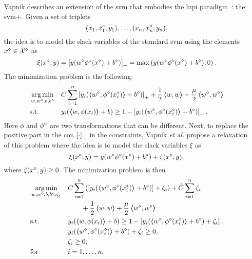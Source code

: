 Vapnik describes an extension of the \acrshort{svm} that embodies the \acrshort{lupi} paradigm~\citep{VapnikV09,VapnikI15a}: the \acrshort{svm}+. Given a set of triplets
\begin{equation}
    \nonumber
    (x_1, {x}^{\diamond}_1, y_1), \ldots, (x_n, {x}^{\diamond}_n, y_n) ,
\end{equation}
the idea is to model the slack variables of the standard \acrshort{svm} using the elements ${x}^{\diamond} \in {\mathcal{X}}^{\diamond}$ as
$$ \xi({x}^{\diamond}, y) = \left[y ({w}^{\diamond} {\phi}^{\diamond}({x}^{\diamond}) + {b}^{\diamond}) \right]_+  = \max\left( y ({w}^{\diamond} {\phi}^{\diamond}({x}^{\diamond}) + {b}^{\diamond}), 0  \right).$$
The minimization problem is the following:
\begin{equation}
    \label{eq:svmplus_original}
    \begin{aligned}
        & \argmin_{w, \priv{w}, b, \priv{b}}
        & &  C \sum_{i=1}^\nsamples \left[y_i (\dotp{\priv{w}}{\priv{\phi}(x_i^*)} + \priv{b}) \right]_+ + \frac{1}{2} \dotp{w}{w} + \frac{\mu}{2} \dotp{\priv{w}}{\priv{w}} \\
        & \text{s.t.}
        & & y_{i} ( \dotp{w}{\phi(x_{i})} + b) \geq 1 - \left[y_i (\dotp{\priv{w}}{\priv{\phi}(\priv{x}_i)} + \priv{b}) \right]_+ .
    \end{aligned}
\end{equation}
Here $\phi$ and ${\phi}^{\diamond}$ are two transformations that can be different.
Next, to replace the positive part in the con $\left[\cdot\right]_{+}$ in the constraints,
Vapnik \emph{et al.} propose a relaxation of this problem where the idea is to model the slack variables $\xi$ as
$$ \xi({x}^{\diamond}, y) = y ({w}^{\diamond} {\phi}^{\diamond}({x}^{\diamond}) + {b}^{\diamond}) + \zeta({x}^{\diamond}, y) ,$$
where $\zeta({x}^{\diamond}, y) \geq 0$.
The minimization problem is then
\begin{equation}
    \label{eq:svmplus_delta_primal}
    \begin{aligned}
        & \argmin_{w, \priv{w}, b, \priv{b}, \zeta_i}
        & &  C \sum_{i=1}^\nsamples \left( \left[y_i (\dotp{\priv{w}}{\priv{\phi}(x_i^*)} + \priv{b}) \right] + \zeta_i \right) + \hat{C} \sum_{i=1}^\nsamples \zeta_i \\
        & & &\qquad + \frac{1}{2} \dotp{w}{w} + \frac{\mu}{2} \dotp{\priv{w}}{\priv{w}} \\
        & \text{s.t.}
        & & y_{i} ( \dotp{w}{\phi(x_{i})} + b) \geq 1 - \left[y_i (\dotp{\priv{w}}{\priv{\phi}(\priv{x}_i)} + \priv{b}) + \zeta_i \right] ,\\
        & & &y_i (\dotp{\priv{w}}{\priv{\phi}(\priv{x}_i)} + \priv{b}) + \zeta_i \geq 0 ,\\
        & & &\zeta_i \geq 0, \\
        & \text{for } & & i=1, \ldots, \nsamples,
    \end{aligned}
\end{equation}
